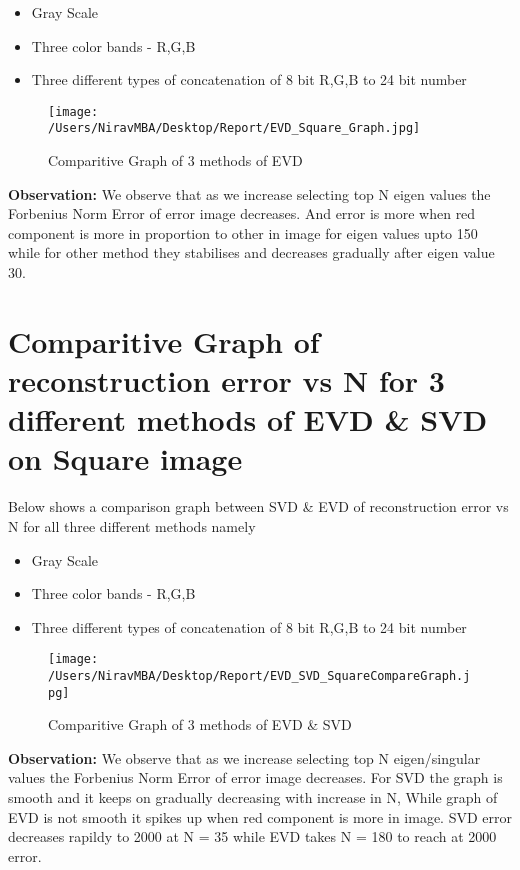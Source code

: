 \documentclass[12pt]{report}
\begin{document}
\begin{itemize}
	\item Gray Scale
	\item Three color bands - R,G,B
	\item Three different types of concatenation of 8 bit R,G,B to 24 bit number
\end{itemize}


\begin{figure}[H]
	
	\texttt{[image: /Users/NiravMBA/Desktop/Report/EVD\_Square\_Graph.jpg]}
	\caption{Comparitive Graph of 3 methods of EVD}
\end{figure}


{\bfseries Observation: }
We observe that as we increase selecting top N eigen values the Forbenius Norm Error of error image decreases. And error is more when red component is more in proportion to other in image for eigen values upto 150 while for other method they stabilises and decreases gradually after eigen value 30.\\

\cleardoublepage



\section{Comparitive Graph of reconstruction error vs N for 3 different methods of EVD \& SVD on Square image }

Below shows a comparison graph between SVD \& EVD of reconstruction error vs N for all three different methods namely \\  

\begin{itemize}
	\item Gray Scale
	\item Three color bands - R,G,B
	\item Three different types of concatenation of 8 bit R,G,B to 24 bit number
\end{itemize}

\begin{figure}[H]
	
	\texttt{[image: /Users/NiravMBA/Desktop/Report/EVD\_SVD\_SquareCompareGraph.jpg]}
	\caption{Comparitive Graph of 3 methods of EVD \& SVD}
\end{figure}


{\bfseries Observation: }
We observe that as we increase selecting top N eigen/singular values the Forbenius Norm Error of error image decreases. For SVD the graph is smooth and it keeps on gradually decreasing with increase in N, While graph of EVD is not smooth it spikes up when red component is more in image. SVD error decreases rapildy to 2000 at N = 35 while EVD takes N = 180 to reach at 2000 error. \\
\end{document}
